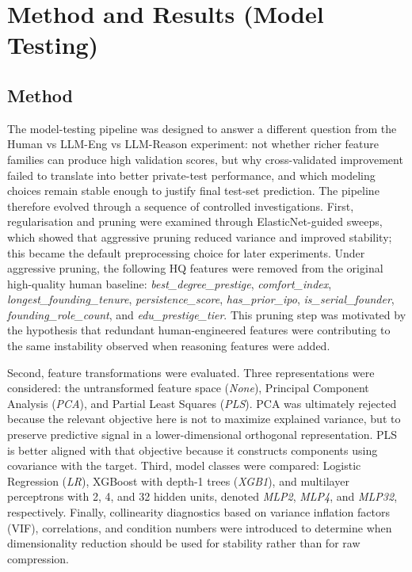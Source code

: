 \documentclass{article}
\theoremstyle{plain}
\theoremstyle{definition}
\theoremstyle{remark}
\begin{document}
\section{Method and Results (Model Testing)}
\subsection{Method}
The model-testing pipeline was designed to answer a different question from the Human vs LLM-Eng vs LLM-Reason experiment: not whether richer feature families can produce high validation scores, but why cross-validated improvement failed to translate into better private-test performance, and which modeling choices remain stable enough to justify final test-set prediction. The pipeline therefore evolved through a sequence of controlled investigations. First, regularisation and pruning were examined through ElasticNet-guided sweeps, which showed that aggressive pruning reduced variance and improved stability; this became the default preprocessing choice for later experiments. Under aggressive pruning, the following HQ features were removed from the original high-quality human baseline: \textit{best\_degree\_prestige}, \textit{comfort\_index}, \textit{longest\_founding\_tenure}, \textit{persistence\_score}, \textit{has\_prior\_ipo}, \textit{is\_serial\_founder}, \textit{founding\_role\_count}, and \textit{edu\_prestige\_tier}. This pruning step was motivated by the hypothesis that redundant human-engineered features were contributing to the same instability observed when reasoning features were added.

Second, feature transformations were evaluated. Three representations were considered: the untransformed feature space (\textit{None}), Principal Component Analysis (\textit{PCA}), and Partial Least Squares (\textit{PLS}). PCA was ultimately rejected because the relevant objective here is not to maximize explained variance, but to preserve predictive signal in a lower-dimensional orthogonal representation. PLS is better aligned with that objective because it constructs components using covariance with the target. Third, model classes were compared: Logistic Regression (\textit{LR}), XGBoost with depth-1 trees (\textit{XGB1}), and multilayer perceptrons with 2, 4, and 32 hidden units, denoted \textit{MLP2}, \textit{MLP4}, and \textit{MLP32}, respectively. Finally, collinearity diagnostics based on variance inflation factors (VIF), correlations, and condition numbers were introduced to determine when dimensionality reduction should be used for stability rather than for raw compression.
\end{document}
